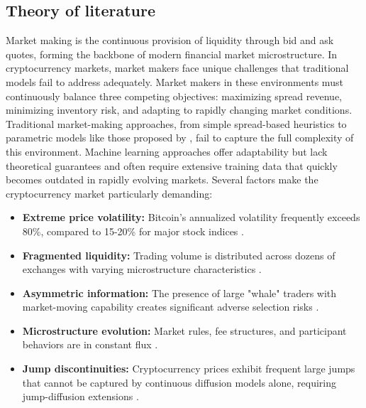 \documentclass[twocolumn,ieee]{arithmaxresearch}
\begin{document}
\subsection{Theory of literature}

Market making is the continuous provision of liquidity through bid and ask quotes, forming the backbone of modern financial market microstructure. In cryptocurrency markets, market makers face unique challenges that traditional models fail to address adequately. Market makers in these environments must continuously balance three competing objectives: maximizing spread revenue, minimizing inventory risk, and adapting to rapidly changing market conditions. Traditional market-making approaches, from simple spread-based heuristics to parametric models like those proposed by \cite{avellaneda2008}, fail to capture the full complexity of this environment. Machine learning approaches \cite{spooner2018market} offer adaptability but lack theoretical guarantees and often require extensive training data that quickly becomes outdated in rapidly evolving markets. Several factors make the cryptocurrency market particularly demanding:

\begin{itemize}
    \item \textbf{Extreme price volatility:} Bitcoin's annualized volatility frequently exceeds 80\%, compared to 15-20\% for major stock indices \cite{baur2018bitcoin}.
    
    \item \textbf{Fragmented liquidity:} Trading volume is distributed across dozens of exchanges with varying microstructure characteristics \cite{makarov2020trading}.
    
    \item \textbf{Asymmetric information:} The presence of large "whale" traders with market-moving capability creates significant adverse selection risks \cite{cong2021crypto}.
    
    \item \textbf{Microstructure evolution:} Market rules, fee structures, and participant behaviors are in constant flux \cite{hautsch2019limits}.
    
    \item \textbf{Jump discontinuities:} Cryptocurrency prices exhibit frequent large jumps that cannot be captured by continuous diffusion models alone, requiring jump-diffusion extensions \cite{merton1976option}.
\end{itemize}
\end{document}
